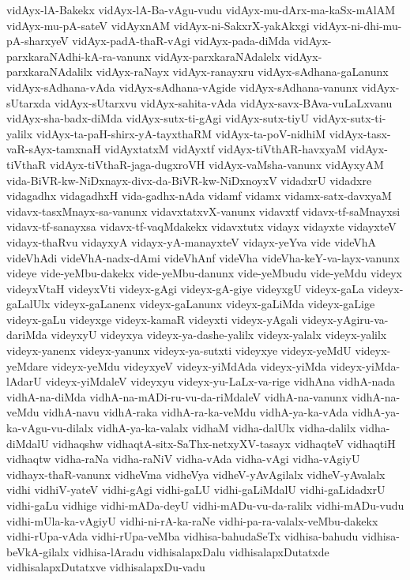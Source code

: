 {vidAyx-lA-Bakekx
vidAyx-lA-Ba-vAgu-vudu
vidAyx-mu-dArx-ma-kaSx-mAlAM
vidAyx-mu-pA-sateV
vidAyxnAM
vidAyx-ni-SakxrX-yakAkxgi
vidAyx-ni-dhi-mu-pA-sharxyeV
vidAyx-padA-thaR-vAgi
vidAyx-pada-diMda
vidAyx-parxkaraNAdhi-kA-ra-vanunx
vidAyx-parxkaraNAdalelx
vidAyx-parxkaraNAdalilx
vidAyx-raNayx
vidAyx-ranayxru
vidAyx-sAdhana-gaLanunx
vidAyx-sAdhana-vAda
vidAyx-sAdhana-vAgide
vidAyx-sAdhana-vanunx
vidAyx-sUtarxda
vidAyx-sUtarxvu
vidAyx-sahita-vAda
vidAyx-savx-BAva-vuLaLxvanu
vidAyx-sha-badx-diMda
vidAyx-sutx-ti-gAgi
vidAyx-sutx-tiyU
vidAyx-sutx-ti-yalilx
vidAyx-ta-paH-shirx-yA-tayxthaRM
vidAyx-ta-poV-nidhiM
vidAyx-tasx-vaR-sAyx-tamxnaH
vidAyxtatxM
vidAyxtf
vidAyx-tiVthAR-havxyaM
vidAyx-tiVthaR
vidAyx-tiVthaR-jaga-dugxroVH
vidAyx-vaMsha-vanunx
vidAyxyAM
vida-BiVR-kw-NiDxnayx-divx-da-BiVR-kw-NiDxnoyxV
vidadxrU
vidadxre
vidagadhx
vidagadhxH
vida-gadhx-nAda
vidamf
vidamx
vidamx-satx-davxyaM
vidavx-tasxMnayx-sa-vanunx
vidavxtatxvX-vanunx
vidavxtf
vidavx-tf-saMnayxsi
vidavx-tf-sanayxsa
vidavx-tf-vaqMdakekx
vidavxtutx
vidayx
vidayxte
vidayxteV
vidayx-thaRvu
vidayxyA
vidayx-yA-manayxteV
vidayx-yeYva
vide
videVhA
videVhAdi
videVhA-nadx-dAmi
videVhAnf
videVha
videVha-keY-va-layx-vanunx
videye
vide-yeMbu-dakekx
vide-yeMbu-danunx
vide-yeMbudu
vide-yeMdu
videyx
videyxVtaH
videyxVti
videyx-gAgi
videyx-gA-giye
videyxgU
videyx-gaLa
videyx-gaLalUlx
videyx-gaLanenx
videyx-gaLanunx
videyx-gaLiMda
videyx-gaLige
videyx-gaLu
videyxge
videyx-kamaR
videyxti
videyx-yAgali
videyx-yAgiru-va-dariMda
videyxyU
videyxya
videyx-ya-dashe-yalilx
videyx-yalalx
videyx-yalilx
videyx-yanenx
videyx-yanunx
videyx-ya-sutxti
videyxye
videyx-yeMdU
videyx-yeMdare
videyx-yeMdu
videyxyeV
videyx-yiMdAda
videyx-yiMda
videyx-yiMda-lAdarU
videyx-yiMdaleV
videyxyu
videyx-yu-LaLx-va-rige
vidhAna
vidhA-nada
vidhA-na-diMda
vidhA-na-mADi-ru-vu-da-riMdaleV
vidhA-na-vanunx
vidhA-na-veMdu
vidhA-navu
vidhA-raka
vidhA-ra-ka-veMdu
vidhA-ya-ka-vAda
vidhA-ya-ka-vAgu-vu-dilalx
vidhA-ya-ka-valalx
vidhaM
vidha-dalUlx
vidha-dalilx
vidha-diMdalU
vidhaqshw
vidhaqtA-sitx-SaThx-netxyXV-tasayx
vidhaqteV
vidhaqtiH
vidhaqtw
vidha-raNa
vidha-raNiV
vidha-vAda
vidha-vAgi
vidha-vAgiyU
vidhayx-thaR-vanunx
vidheVma
vidheVya
vidheV-yAvAgilalx
vidheV-yAvalalx
vidhi
vidhiV-yateV
vidhi-gAgi
vidhi-gaLU
vidhi-gaLiMdalU
vidhi-gaLidadxrU
vidhi-gaLu
vidhige
vidhi-mADa-deyU
vidhi-mADu-vu-da-ralilx
vidhi-mADu-vudu
vidhi-mUla-ka-vAgiyU
vidhi-ni-rA-ka-raNe
vidhi-pa-ra-valalx-veMbu-dakekx
vidhi-rUpa-vAda
vidhi-rUpa-veMba
vidhisa-bahudaSeTx
vidhisa-bahudu
vidhisa-beVkA-gilalx
vidhisa-lAradu
vidhisalapxDalu
vidhisalapxDutatxde
vidhisalapxDutatxve
vidhisalapxDu-vadu
}
